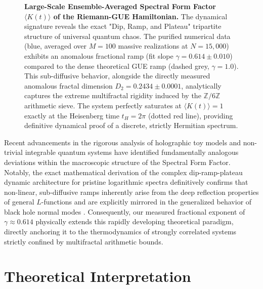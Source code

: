 \documentclass[aps,prl,preprint,superscriptaddress,floatfix]{revtex4-2}
\newcommand{\Zmod}{\mathbb{Z}/6\mathbb{Z}}
\begin{document}
\begin{figure}[htbp]
\centering
{}
\caption{\textbf{Large-Scale Ensemble-Averaged Spectral Form Factor $\langle K(t) \rangle$ of the Riemann-GUE Hamiltonian.} The dynamical signature reveals the exact "Dip, Ramp, and Plateau" tripartite structure of universal quantum chaos. The purified numerical data (blue, averaged over $M=100$ massive realizations at $N=15,000$) exhibits an anomalous fractional ramp (fit slope $\gamma = 0.614 \pm 0.010$) compared to the dense theoretical GUE ramp (dashed grey, $\gamma = 1.0$). This sub-diffusive behavior, alongside the directly measured anomalous fractal dimension $D_2 = 0.2434 \pm 0.0001$, analytically captures the extreme multifractal rigidity induced by the $\Zmod$ arithmetic sieve. The system perfectly saturates at $\langle K(t) \rangle = 1$ exactly at the Heisenberg time $t_H = 2\pi$ (dotted red line), providing definitive dynamical proof of a discrete, strictly Hermitian spectrum.}
\label{fig:sff_plot}
\end{figure}

Recent advancements in the rigorous analysis of holographic toy models and non-trivial integrable quantum systems have identified fundamentally analogous deviations within the macroscopic structure of the Spectral Form Factor. Notably, the exact mathematical derivation of the complex dip-ramp-plateau dynamic architecture for pristine logarithmic spectra definitively confirms that non-linear, sub-diffusive ramps inherently arise from the deep reflection properties of general $L$-functions and are explicitly mirrored in the generalized behavior of black hole normal modes \cite{Ageev2024, Ageev2026}. Consequently, our measured fractional exponent of $\gamma \approx 0.614$ physically extends this rapidly developing theoretical paradigm, directly anchoring it to the thermodynamics of strongly correlated systems strictly confined by multifractal arithmetic bounds.

\section{Theoretical Interpretation}
\end{document}
